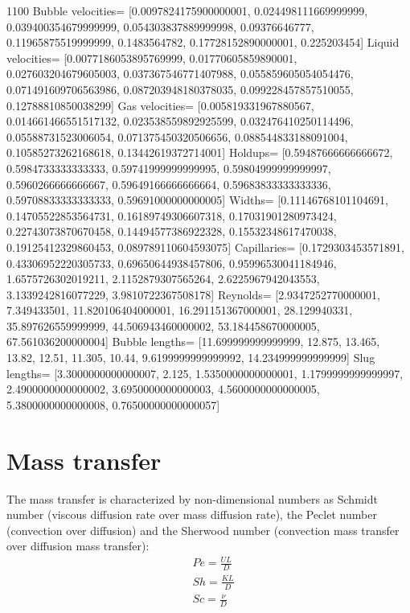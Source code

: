 \documentclass{article}
\begin{document}
1100
Bubble velocities= [0.0097824175900000001, 0.024498111669999999, 0.039400354679999999,
0.054303837889999998, 0.09376646777, 0.11965875519999999, 0.1483564782, 0.17728152890000001,
0.225203454]
Liquid velocities= [0.0077186053895769999, 0.01770605859890001, 0.027603204679605003,
0.037367546771407988, 0.055859605054054476, 0.071491609706563986, 0.087203948180378035,
0.099228457857510055, 0.12788810850038299]
Gas velocities= [0.005819331967880567, 0.014661466551517132, 0.023538559892925599,
0.032476410250114496, 0.05588731523006054, 0.071375450320506656, 0.088544833188091004,
0.10585273262168618, 0.13442619372714001]
Holdups= [0.59487666666666672, 0.5984733333333333, 0.59741999999999995, 0.59804999999999997,
0.5960266666666667, 0.59649166666666664, 0.59683833333333336, 0.59708833333333333,
0.59691000000000005]
Widths= [0.11146768101104691, 0.14705522853564731, 0.16189749306607318, 0.17031901280973424,
0.22743073870670458, 0.14494577386922328, 0.15532348617470038, 0.19125412329860453,
0.089789110604593075]
Capillaries= [0.1729303453571891, 0.43306952220305733, 0.69650644938457806, 0.95996530041184946,
1.6575726302019211, 2.1152879307565264, 2.6225967942043553, 3.1339242816077229, 3.9810722367508178]
Reynolds= [2.9347252770000001, 7.349433501, 11.820106404000001, 16.291151367000001, 28.129940331,
35.897626559999999, 44.506943460000002, 53.184458670000005, 67.561036200000004]
Bubble lengths= [11.699999999999999, 12.875, 13.465, 13.82, 12.51, 11.305, 10.44,
9.6199999999999992, 14.234999999999999]
Slug lengths= [3.3000000000000007, 2.125, 1.5350000000000001, 1.1799999999999997,
2.4900000000000002, 3.6950000000000003, 4.5600000000000005, 5.3800000000000008, 0.76500000000000057]


\section{Mass transfer}
The mass transfer is characterized by non-dimensional numbers as Schmidt number (viscous diffusion
rate over mass diffusion rate), the Peclet number (convection over diffusion) and the Sherwood
number (convection mass transfer over diffusion mass transfer):
\begin{equation}
\begin{aligned}
&Pe=\frac{U L}{D}\\
&Sh=\frac{K L}{D}\\
&Sc=\frac{\nu}{D}\\
\end{aligned}
\end{equation}
\end{document}
